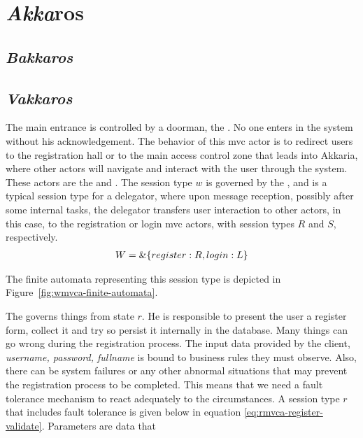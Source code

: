 
\chapter{\emph{Akka}ros}
\label{sec:akkaros}

\section{\emph{Bakkaros}}
\label{sec:bakkaros}

\section{\emph{Vakkaros}}
\label{sec:vaakkaros}

The main entrance is controlled by a doorman, the
. No one enters in the system without his
acknowledgement. The behavior of this mvc actor is to redirect users
to the registration hall or to the main access control zone that leads
into Akkaria, where other actors will navigate and interact with the
user through the system. These actors are the 
and .
%
The session type $w$ is governed by the , and is
a typical session type for a delegator, where upon message reception,
possibly after some internal tasks, the delegator transfers user
interaction to other actors, in this case, to the registration or
login mvc actors, with session types $R$ and $S$, respectively.
%
\begin{align}
  W = \& \{register: R, login: L\}
\end{align}
%
\par
%
The finite automata representing this session type is depicted in
Figure~\ref{fig:wmvca-finite-automata}.
%

%
\par
%
The  governs things from state $r$. He is
responsible to present the user a register form, collect it and try so
persist it internally in the database.
%
Many things can go wrong during the registration process. The input
data provided by the client, \emph{username, password, fullname} is
bound to business rules they must observe. Also, there can be system
failures or any other abnormal situations that may prevent the
registration process to be completed. This means that we need a fault
tolerance mechanism to react adequately to the circumstances.
%
A session type $r$ that includes fault tolerance is given below in
equation \ref{eq:rmvca-register-validate}. Parameters are data that
